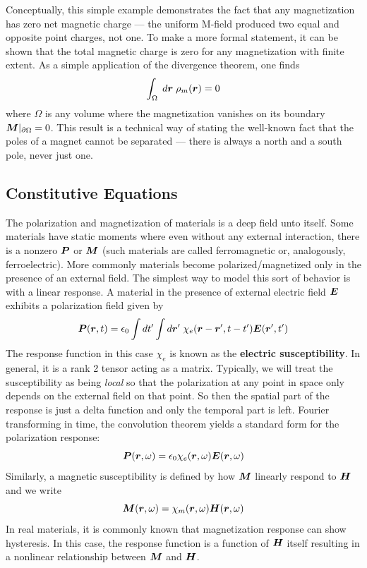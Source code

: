 \documentclass[twocolumn]{gwclass}
\begin{document}
	Conceptually, this simple example demonstrates the fact that any magnetization has zero net magnetic charge --- the uniform M-field produced two equal and opposite point charges, not one. To make a more formal statement, it can be shown that the total magnetic charge is zero for any magnetization with finite extent. As a simple application of the divergence theorem, one finds 
	$$  \int_\Omega\;d\boldsymbol{r}\;\rho_m(\boldsymbol{r}) = 0 $$
	where $\Omega$ is any volume where the magnetization vanishes on its boundary $\boldsymbol{M}|_{\partial\Omega}=0$. This result is a technical way of stating the well-known fact that the poles of a magnet cannot be separated --- there is always a north and a south pole, never just one.

	

	\subsection{Constitutive Equations}
	The polarization and magnetization of materials is a deep field unto itself. Some materials have static moments where even without any external interaction, there is a nonzero $\boldsymbol{P}$ or $\boldsymbol{M}$ (such materials are called ferromagnetic or, analogously, ferroelectric). More commonly materials become polarized/magnetized only in the presence of an external field. The simplest way to model this sort of behavior is with a linear response. A material in the presence of external electric field $\boldsymbol{E}$ exhibits a polarization field given by
	$$ \boldsymbol{P}(\boldsymbol{r},t) = \epsilon_0 \int dt'\int d\boldsymbol{r}'\;\chi_e(\boldsymbol{r}-\boldsymbol{r}',t-t')\boldsymbol{E}(\boldsymbol{r}',t') $$
	The response function in this case $\chi_e$ is known as the \textbf{electric susceptibility}. In general, it is a rank 2 tensor acting as a matrix. Typically, we will treat the susceptibility as being \emph{local} so that the polarization at any point in space only depends on the external field on that point. So then the spatial part of the response is just a delta function and only the temporal part is left. Fourier transforming in time, the convolution theorem yields a standard form for the polarization response:
	$$ \boldsymbol{P}(\boldsymbol{r},\omega) = \epsilon_0\chi_e(\boldsymbol{r},\omega)\boldsymbol{E}(\boldsymbol{r},\omega) $$
	Similarly, a magnetic susceptibility is defined by how $\boldsymbol{M}$ linearly respond to $\boldsymbol{H}$ and we write
	$$ \boldsymbol{M}(\boldsymbol{r},\omega) = \chi_m(\boldsymbol{r},\omega)\boldsymbol{H}(\boldsymbol{r},\omega) $$
	In real materials, it is commonly known that magnetization response can show hysteresis. In this case, the response function is a function of $\boldsymbol{H}$ itself resulting in a nonlinear relationship between $\boldsymbol{M}$ and $\boldsymbol{H}$.
	
\end{document}
